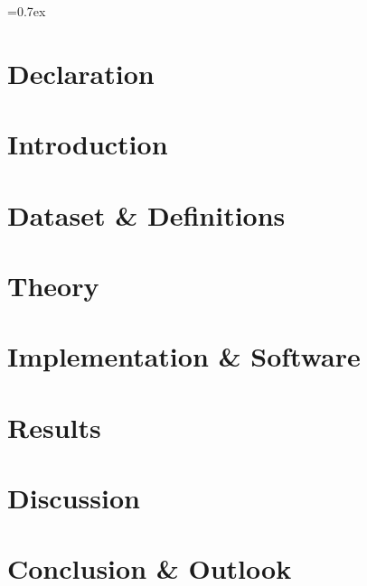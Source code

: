 


	
	\font=0.7ex%

	
	\tableofcontents
	\thispagestyle{empty}
	
	\pagestyle{fancy}
	\fancyhf{}
	\cfoot{\thepage}
	
	\newpage
	\section*{Declaration}
	
	
	\newpage
	\section{Introduction}
	
	
	\section{Dataset \& Definitions}\label{sec:dataset_definitions}
	
	
	\section{Theory}\label{sec:theory}
	
	
	\section{Implementation \& Software}\label{sec:implementation_software}
	
	
	\section{Results}\label{sec:results}
	
	
	\section{Discussion}\label{sec:discussion}
	
	
	\section{Conclusion \& Outlook}\label{sec:conclusion_outlook}
	

	\newpage
	\printbibliography
	
